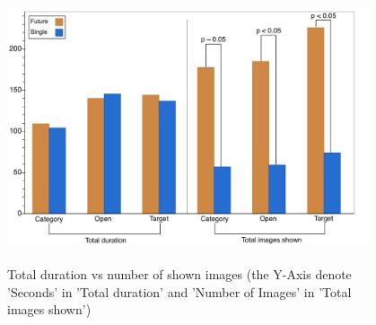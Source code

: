 \documentclass[english]{tktltiki}
\begin{document}
\begin{figure}[h!]
  \centering
    \includegraphics[width=0.95\textwidth,height=8cm]{figures/Bar_Chart__Duration_vs_Images.jpg}
    \caption{Total duration vs number of shown images (the Y-Axis denote 'Seconds' in 'Total duration' and 'Number of Images' in 'Total images shown')}
    
    \label{dur_vs_img}
\end{figure}
\end{document}
